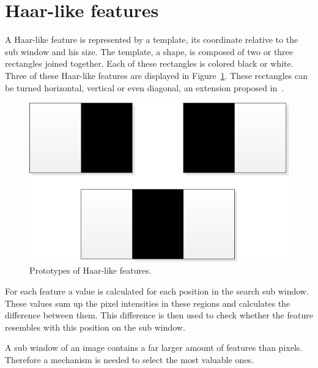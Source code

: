 \documentclass{article}
\begin{document}
\section{Haar-like features}
A Haar-like feature is represented by a template, its coordinate relative to the sub window and his size.
The template, a shape, is composed of two or three rectangles joined together. Each of these rectangles is colored black or white. Three of these Haar-like features are displayed in Figure~\ref{fig:features}. These rectangles can be turned horizontal, vertical or even  diagonal, an extension proposed in~\cite{lienhart2002extended}.

\begin{figure}[h!]
	\centering
	\includegraphics[scale=0.6]{Features.png}
	\caption{Prototypes of Haar-like features.}
	\label{fig:features}
\end{figure}

\par
For each feature a value is calculated for each position in the search sub window. These values sum up the pixel intensities in these regions and calculates the difference between them. This difference is then used to check whether the feature resembles with this position on the sub window.
\par
A sub window of an image contains a far larger amount of features than pixels. Therefore a mechanism is needed to select the most valuable ones.
\end{document}
